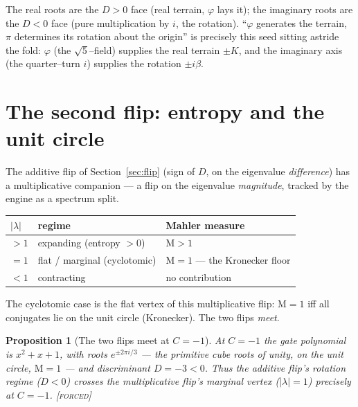 \documentclass[11pt]{article}
\theoremstyle{plain}
\newtheorem{proposition}[theorem]{Proposition}
\theoremstyle{definition}
\theoremstyle{remark}
\newcommand{\forced}{\textcolor{forcedc}{\textsc{[forced]}}}
\newcommand{\Mah}{\mathrm{M}}
\newcommand{\abs}[1]{\left\lvert #1 \right\rvert}
\begin{document}
The real roots are the $D>0$ face (real terrain, $\varphi$ lays it); the imaginary roots are the $D<0$ face (pure multiplication by $i$, the rotation). ``$\varphi$ generates the terrain, $\pi$ determines its rotation about the origin'' is precisely this seed sitting astride the fold: $\varphi$ (the $\sqrt5$--field) supplies the real terrain $\pm K$, and the imaginary axis (the quarter--turn $i$) supplies the rotation $\pm i\beta$.

\section{The second flip: entropy and the unit circle}\label{sec:secondflip}

The additive flip of Section~\ref{sec:flip} (sign of $D$, on the eigenvalue \emph{difference}) has a multiplicative companion --- a flip on the eigenvalue \emph{magnitude}, tracked by the engine as a spectrum split.

\begin{center}
\renewcommand{\arraystretch}{1.3}
\begin{tabular}{@{}lll@{}}
\toprule
$\abs\lambda$ & regime & Mahler measure \\
\midrule
$>1$ & expanding (entropy $>0$) & $\Mah>1$ \\
$=1$ & flat / marginal (cyclotomic) & $\Mah=1$ --- the Kronecker floor \\
$<1$ & contracting & no contribution \\
\bottomrule
\end{tabular}
\end{center}

\noindent The cyclotomic case is the flat vertex of this multiplicative flip: $\Mah=1$ iff all conjugates lie on the unit circle (Kronecker). The two flips \emph{meet}.

\begin{proposition}[The two flips meet at $C=-1$]\label{prop:meet}
At $C=-1$ the gate polynomial is $x^2+x+1$, with roots $e^{\pm 2\pi i/3}$ --- the primitive cube roots of unity, on the unit circle, $\Mah=1$ --- and discriminant $D=-3<0$. Thus the additive flip's rotation regime ($D<0$) crosses the multiplicative flip's marginal vertex ($\abs\lambda=1$) precisely at $C=-1$. \forced
\end{proposition}
\end{document}
